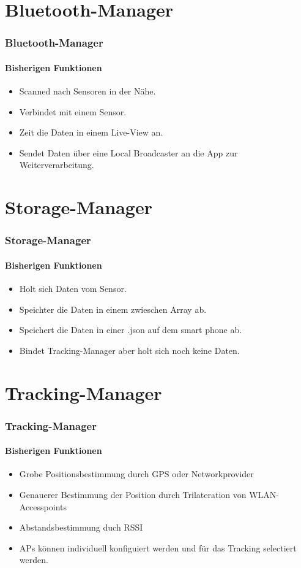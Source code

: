 \documentclass{beamer}
\begin{document}
\section{Bluetooth-Manager}

\begin{frame}
\frametitle{Bluetooth-Manager}
\framesubtitle{Bisherigen Funktionen}
\begin{itemize}
  \item Scanned nach Sensoren in der N\"ahe.
	\item Verbindet mit einem Sensor.
  \item Zeit die Daten in einem Live-View an.
  \item Sendet Daten \"uber eine Local Broadcaster an die App zur Weiterverarbeitung.
\end{itemize}
\end{frame}


\section{Storage-Manager}

\begin{frame}
\frametitle{Storage-Manager}
\framesubtitle{Bisherigen Funktionen}
\begin{itemize}
  \item Holt sich Daten vom Sensor.
	\item Speichter die Daten in einem zwieschen Array ab.
  \item Speichert die Daten in einer .json auf dem smart phone ab.
  \item Bindet Tracking-Manager aber holt sich noch keine Daten.
\end{itemize}
\end{frame}


\section{Tracking-Manager}

\begin{frame}
\frametitle{Tracking-Manager}
\framesubtitle{Bisherigen Funktionen}
\begin{itemize}
  \item Grobe Positionsbestimmung durch GPS oder Networkprovider
  \item	Genauerer Bestimmung der Position durch Trilateration von WLAN-Accesspoints
  \item	Abstandsbestimmung duch RSSI
  \item	APs k\"onnen individuell konfiguiert werden und f\"ur das Tracking selectiert werden. 
\end{itemize}
\end{frame}
\end{document}
